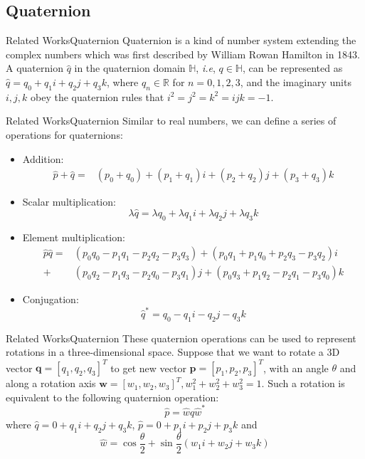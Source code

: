 \documentclass{beamer}
\begin{document}
\subsection{Quaternion}
\begin{frame}{Related Works}{Quaternion}
Quaternion is a kind of number system extending the complex numbers which was first described by William Rowan Hamilton in 1843. A quaternion $\hat{q}$ in the quaternion domain $\mathbb{H}$, \emph{i.e}, $q\in \mathbb{H}$, can be represented as $\hat{q}=q_0+q_1i+q_2j+q_3k$, where $q_n\in \mathbb{R}$ for $n=0,1,2,3$, and the imaginary units $i,j,k$ obey the quaternion rules that $i^2=j^2=k^2=ijk=-1$. 
\end{frame}
\begin{frame}{Related Works}{Quaternion}
Similar to real numbers, we can define a series of operations for quaternions:
\begin{itemize}
    \item Addition:
    \begin{equation*}
        \begin{split}
            \hat{p}+\hat{q}=&(p_0+q_0)+(p_1+q_1)i
                            +(p_2+q_2)j+(p_3+q_3)k
        \end{split}
    \end{equation*}
    \item Scalar multiplication: $$\lambda \hat{q}=\lambda q_0+\lambda q_1i+\lambda q_2j+\lambda q_3k$$
    \item Element multiplication: 
    \begin{equation*}
        \begin{split}
            \hat{p}\hat{q}=&(p_0q_0-p_1q_1-p_2q_2-p_3q_3)
                        +(p_0q_1+p_1q_0+p_2q_3-p_3q_2)i\\
                        +&(p_0q_2-p_1q_3-p_2q_0-p_3q_1)j
                        +(p_0q_3+p_1q_2-p_2q_1-p_3q_0)k
        \end{split}
    \end{equation*}
    \item Conjugation: $$\hat{q}^*=q_0-q_1i-q_2j-q_3k$$
\end{itemize}
\end{frame}
\begin{frame}{Related Works}{Quaternion}
These quaternion operations can be used to represent rotations in a three-dimensional space. Suppose that we want to rotate a 3D vector $\textbf{q}=[q_1,q_2,q_3]^T$ to get new vector $\textbf{p}=[p_1,p_2,p_3]^T$, with an angle $\theta$ and along a rotation axis $\textbf{w}=[w_1,w_2,w_3]^T, w_1^2+w_2^2+w_3^2=1$. Such a rotation is equivalent to the following quaternion operation: 
\begin{equation}
    \hat{p}=\hat{w}\hat{q}\hat{w}^*
\end{equation}
where $\hat{q}= 0 + q_1i + q_2j + q_3k$, $\hat{p}= 0 + p_1i + p_2j + p_3k$ and 
\begin{equation}
    \hat{w}=\cos\frac{\theta}{2}+\sin\frac{\theta}{2}(w_1i + w_2j + w_3k)
\end{equation}
\end{frame}
\end{document}
